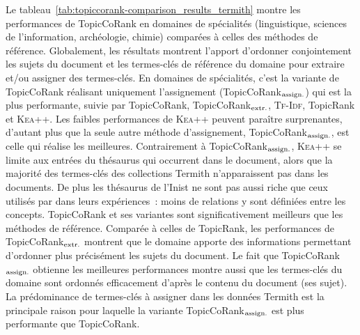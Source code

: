         Le tableau~\ref{tab:topiccorank-comparison_results_termith} montre les
        performances de TopicCoRank en domaines de spécialités (linguistique,
        sciences de l'information, archéologie, chimie) comparées à celles des
        méthodes de référence. Globalement, les résultats montrent l'apport
        d'ordonner conjointement les sujets du document et les termes-clés de
        référence du domaine pour extraire et/ou assigner des termes-clés. En
        domaines de spécialités, c'est la variante de TopicCoRank réalisant
        uniquement l'assignement (TopicCoRank$_\textnormal{assign.}$) qui est la
        plus performante, suivie par TopicCoRank,
        TopicCoRank$_\textnormal{extr.}$, \textsc{Tf-Idf}, TopicRank et
        \textsc{Kea++}. Les faibles performances de \textsc{Kea++} peuvent
        paraître surprenantes, d'autant plus que la seule autre méthode
        d'assignement, TopicCoRank$_\textnormal{assign.}$, est celle qui réalise
        les meilleures. Contrairement à TopicCoRank$_\textnormal{assign.}$,
        \textsc{Kea++} se limite aux entrées du thésaurus qui occurrent dans le
        document, alors que la majorité des termes-clés des collections Termith
        n'apparaissent pas dans les documents. De plus les thésaurus de l'Inist
        ne sont pas aussi riche que ceux utilisés par
         dans leurs expériences~: moins de relations
        y sont définiées entre les concepts. TopicCoRank et ses variantes sont
        significativement meilleurs que les méthodes de référence. Comparée à
        celles de TopicRank, les performances de
        TopicCoRank$_\textnormal{extr.}$ montrent que le domaine apporte des
        informations permettant d'ordonner plus précisément les sujets du
        document. Le fait que TopicCoRank$_\textnormal{assign.}$ obtienne les
        meilleures performances montre aussi que les termes-clés du domaine sont
        ordonnés efficacement d'après le contenu du document (ses sujet). La
        prédominance de termes-clés à assigner dans les données Termith est la
        principale raison pour laquelle la variante
        TopicCoRank$_\textnormal{assign.}$ est plus performante que TopicCoRank.
